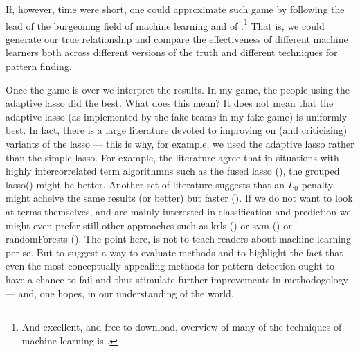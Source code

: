 \documentclass[12pt]{article}
\begin{document}
If, however, time were short, one could approximate such game by following the
lead of the burgeoning field of machine learning and of
\citet{lucasf2013}.\footnote{And excellent, and free to download, overview of
	many of the techniques of machine learning is \citet{hastie2005elements}.}
That is, we could generate our true relationship and compare the effectiveness
of different machine learners both across different versions of the truth  and
different techniques for pattern finding. 




Once the game is over we interpret the results. In my game, the people using
the adaptive lasso did the best. What does this mean? It does not mean that
the adaptive lasso (as implemented by the fake teams in my fake game) is
uniformly best. In fact, there is a large literature devoted to improving on
(and criticizing) variants of the lasso --- this is why, for example, we used
the adaptive lasso rather than the simple lasso. For example, the literature
agree that in situations with highly intercorrelated term algorithmns such as
the fused lasso (), the grouped lasso() might be better. Another set of
literature suggests that an $L_0$ penalty might acheive the same results (or
better) but faster (). If we do not want to look at terms themselves, and are
mainly interested in classification and prediction we might even prefer still
other approaches such as krls () or svm () or randomForests (). The point
here, is not to teach readers about machine learning per se. But to suggest a
way to evaluate methods and to highlight the fact that even the most
conceptually appealing methods for pattern detection ought to have a chance to
fail and thus stimulate further improvements in methodogology --- and, one
hopes, in our understanding of the world. 
\end{document}
